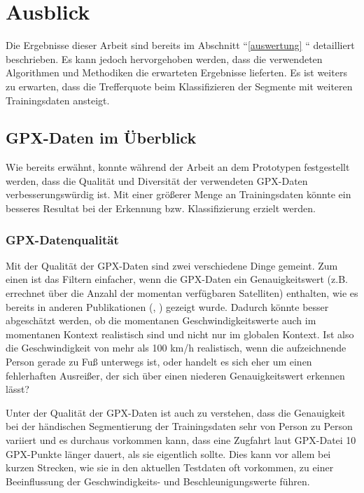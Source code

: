 \chapter{Ausblick}
Die Ergebnisse dieser Arbeit sind bereits im Abschnitt ``\ref{auswertung} `` detailliert beschrieben. Es kann jedoch hervorgehoben werden, dass die verwendeten Algorithmen und Methodiken die erwarteten Ergebnisse lieferten. Es ist weiters zu erwarten, dass die Trefferquote beim Klassifizieren der Segmente mit weiteren Trainingsdaten ansteigt.

\section{GPX-Daten im Überblick}
Wie bereits erwähnt, konnte während der Arbeit an dem Prototypen festgestellt werden, dass die Qualität und Diversität der verwendeten GPX-Daten verbesserungswürdig ist. Mit einer größerer Menge an Trainingsdaten könnte ein besseres Resultat bei der Erkennung bzw. Klassifizierung erzielt werden. 

\subsection{GPX-Datenqualität}
Mit der Qualität der GPX-Daten sind zwei verschiedene Dinge gemeint. Zum einen ist das Filtern einfacher, wenn die GPX-Daten ein Genauigkeitswert (z.B. errechnet über die Anzahl der momentan verfügbaren Satelliten) enthalten, wie es bereits in anderen Publikationen (\cite{stenneth_transportation_2011}, \cite{nadine_schussler_improving_2011}) gezeigt wurde. Dadurch könnte besser abgeschätzt werden, ob die momentanen Geschwindigkeitswerte auch im momentanen Kontext realistisch sind und nicht nur im globalen Kontext. Ist also die Geschwindigkeit von mehr als 100 km/h realistisch, wenn die aufzeichnende Person gerade zu Fuß unterwegs ist, oder handelt es sich eher um einen fehlerhaften Ausreißer, der sich über einen niederen Genauigkeitswert erkennen lässt?

Unter der Qualität der GPX-Daten ist auch zu verstehen, dass die Genauigkeit bei der händischen Segmentierung der Trainingsdaten sehr von Person zu Person variiert und es durchaus vorkommen kann, dass eine Zugfahrt laut GPX-Datei 10 GPX-Punkte länger dauert, als sie eigentlich sollte. Dies kann vor allem bei kurzen Strecken, wie sie in den aktuellen Testdaten oft vorkommen, zu einer Beeinflussung der Geschwindigkeits- und Beschleunigungswerte führen.

